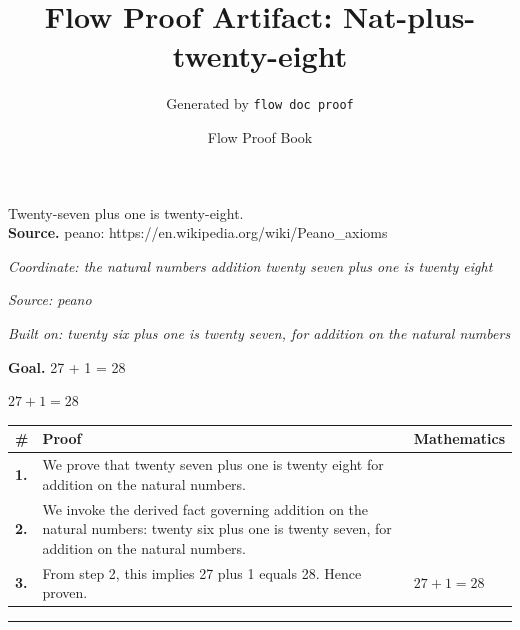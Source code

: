 \documentclass[11pt]{article}
\title{Flow Proof Artifact: Nat-plus-twenty-eight}
\author{Generated by \texttt{flow doc proof}}
\date{Flow Proof Book}
\theoremstyle{definition}
\begin{document}
\maketitle
Twenty-seven plus one is twenty-eight.\\[0.5em]
\textbf{Source.} peano: https://en.wikipedia.org/wiki/Peano\_axioms\\[0.5em]
\bigskip
{}\par
\smallskip\noindent\textit{Coordinate: the natural numbers \cdot addition \cdot twenty seven plus one is twenty eight}\par
\smallskip\noindent\textit{Source: peano}\par
\smallskip\noindent\textit{Built on: twenty six plus one is twenty seven, for addition on the natural numbers}\par
\medskip
\noindent\textbf{Goal.} 27 + 1 = 28\par
\noindent$\displaystyle 27 + 1 = 28$\par
\medskip
\noindent
\begin{tabular}{@{} >{\raggedright\arraybackslash}p{} >{\raggedright\arraybackslash}p{} >{\raggedleft\arraybackslash}p{} @{}}
\textbf{\#} & \textbf{Proof} & \textbf{Mathematics} \\
\midrule
\textbf{1.} & We prove that twenty seven plus one is twenty eight for addition on the natural numbers. & \\[0.45em]
\textbf{2.} & We invoke the derived fact governing addition on the natural numbers: twenty six plus one is twenty seven, for addition on the natural numbers. & \\[0.45em]
\textbf{3.} & From step 2, this implies 27 plus 1 equals 28. Hence proven. & $\displaystyle 27 + 1 = 28$ \\[0.45em]
\bottomrule
\end{tabular}
\label{thm:Nat-addition-twenty_seven_plus_one_is_twenty_eight}
\par\medskip\hrule
\end{document}
